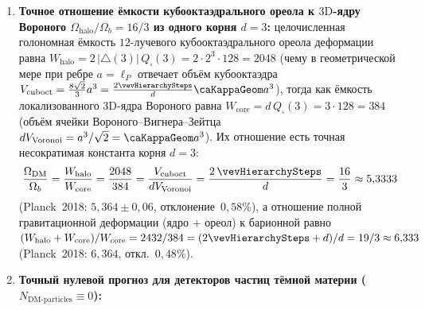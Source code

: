 \begin{theorem}[Запрет частиц «тёмной материи» $D_{\mathrm{dark}}\equiv 0$, вакуумно-голономная природа гало на полу $A_5$ и отношение $\Omega_{\mathrm{halo}}/\Omega_b = 16/3$]
\begin{enumerate}[leftmargin=*]
  \begin{equation}
  \label{eq:cosmo-vacuum-halo-impedance}
    D_{\mathrm{vac}}(x) \;=\; 9856 \;-\; \sum_{y\in x+O_2} |A_{xy}|,
    \qquad
    D_{\mathrm{vac}}(x) \ne 9856 \;\Longleftrightarrow\; \sum_{y\in x+O_2} |A_{xy}| > 0.
  \end{equation}
  Таким образом, любое гравитационное линзирование и центростремительное преломление $\Delta_t A_e = (d_0\Phi)_e$ в безбарионном ореоле галактик ($\mu=1$) порождается не «облаком тёмных частиц», а чисто фазовым натяжением $|A_{xy}| > 0$ единичного вакуумного пола~$A_5$ вокруг барионного вихревого ядра (на пороге дискретности $|A_{xy}|=41$ тик дающим $D_{\mathrm{vac}}=9364$ и выход кривых вращения на плато $v^2(r)=\mathrm{const}$, а при столкновении скоплений типа Bullet Cluster проходящим сквозь заторможенный потолком $A_7/A_{16}$ горячий газ $\mu>1$ вместе с вихревыми ядрами галактик).
\item \textbf{Точное отношение ёмкости кубооктаэдрального ореола к $3\mathrm{D}$-ядру Вороного $\Omega_{\mathrm{halo}}/\Omega_b = 16/3$ из одного корня $d=3$:}
  целочисленная голономная ёмкость $12$-лучевого кубооктаэдрального ореола деформации равна $W_{\mathrm{halo}} = 2\,|\triangle(3)|\,Q_\square(3) = 2\cdot 2^3\cdot 128 = 2048$ (чему в геометрической мере при ребре $a=\ell_P$ отвечает объём кубооктаэдра $V_{\mathrm{cuboct}} = \frac{8\sqrt{2}}{3}a^3 = \frac{2\vevHierarchySteps}{d}\caKappaGeom a^3$), тогда как ёмкость локализованного $3\mathrm{D}$-ядра Вороного равна $W_{\mathrm{core}} = d\,Q_\square(3) = 3\cdot 128 = 384$ (объём ячейки Вороного--Вигнера--Зейтца $dV_{\mathrm{Voronoi}} = a^3/\sqrt{2} = \caKappaGeom a^3$). Их отношение есть точная несократимая константа корня $d=3$:
  \begin{equation}
  \label{eq:cosmo-dm-baryon-16-over-3}
    \frac{\Omega_{\mathrm{DM}}}{\Omega_b}
    = \frac{W_{\mathrm{halo}}}{W_{\mathrm{core}}}
    = \frac{2048}{384}
    = \frac{V_{\mathrm{cuboct}}}{dV_{\mathrm{Voronoi}}}
    = \frac{2\,\vevHierarchySteps}{d}
    = \frac{16}{3} \approx 5{,}3333
  \end{equation}
  (Planck~2018: $5{,}364 \pm 0{,}06$, отклонение~$0{,}58\%$), а отношение полной гравитационной деформации (ядро $+$ ореол) к барионной равно $(W_{\mathrm{halo}}+W_{\mathrm{core}})/W_{\mathrm{core}} = 2432/384 = (2\vevHierarchySteps + d)/d = 19/3 \approx 6{,}333$ (Planck~2018: $6{,}364$, откл.~$0{,}48\%$).
\item \textbf{Точный нулевой прогноз для детекторов частиц тёмной материи ($N_{\mathrm{DM\text{-}particles}} \equiv 0$):}

\end{enumerate}
\end{theorem}
